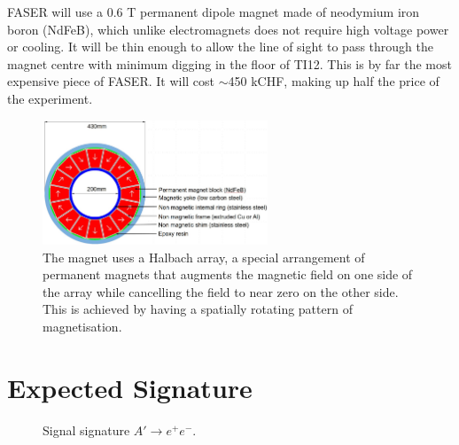 FASER will use a 0.6 T permanent dipole magnet made of neodymium iron boron (NdFeB), which unlike electromagnets does not require high voltage power or cooling. It will be thin enough to allow the line of sight to pass through the magnet centre with minimum digging in the floor of TI12. This is by far the most expensive piece of FASER. It will cost $\sim$450 kCHF, making up half the price of the experiment.

\begin{figure}[htbp!] 
\centering    
\includegraphics[width=0.6\textwidth]{ChapterFaser/Figs/Raster/MagnetDesign.jpg}
\caption[Magnet Design]{The magnet uses a Halbach array, a special arrangement of permanent magnets that augments the magnetic field on one side of the array while cancelling the field to near zero on the other side. This is achieved by having a spatially rotating pattern of magnetisation.
}
\label{fig:MagnetDesign}
\end{figure}

\section{Expected Signature}

\begin{figure}[htbp!] 
\centering    
\caption{Signal signature $A'\rightarrow e^{+}e^{-}$.}
\label{fig:SignalSignature}
\end{figure}

